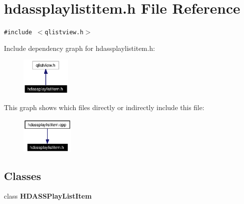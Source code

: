 \section{hdassplaylistitem.h File Reference}
\label{hdassplaylistitem_8h}


{\tt \#include $<$qlistview.h$>$}\par


Include dependency graph for hdassplaylistitem.h:\begin{figure}[H]
\begin{center}
\leavevmode
\includegraphics[width=68pt]{hdassplaylistitem_8h__incl}
\end{center}
\end{figure}


This graph shows which files directly or indirectly include this file:\begin{figure}[H]
\begin{center}
\leavevmode
\includegraphics[width=73pt]{hdassplaylistitem_8h__dep__incl}
\end{center}
\end{figure}
\subsection*{Classes}
\begin{CompactItemize}
\item 
class {\bf HDASSPlay\-List\-Item}
\end{CompactItemize}
